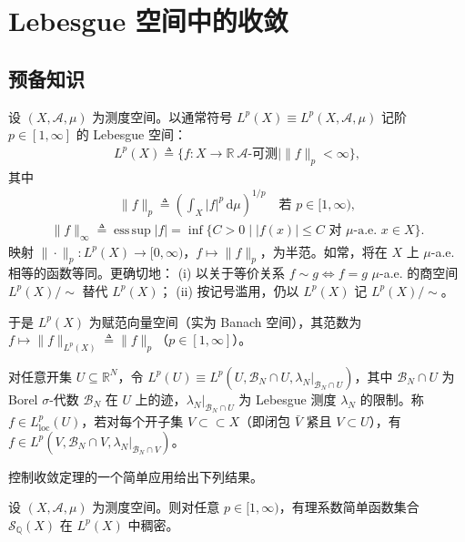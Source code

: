 \documentclass[../../main.tex]{subfiles}%
\begin{document}
\section{Lebesgue 空间中的收敛}\label{section:ch02-Lebesgue收敛}

\subsection{预备知识}\label{subsection:ch02-Lp预备}

设 $(X,\mathscr A,\mu)$ 为测度空间。以通常符号 $L^p(X)\equiv L^p(X,\mathscr A,\mu)$ 记阶 $p\in[1,\infty]$ 的 Lebesgue 空间：
\begin{align*}
L^p(X)\triangleq \{f:X\to\mathbb R\ \mathscr A\text{-可测}\mid\|f\|_p<\infty\},
\end{align*}
其中
\begin{align*}
\|f\|_p\triangleq \left(\int_X|f|^p\,\mathrm{d}\mu\right)^{1/p}\quad\text{若 }p\in[1,\infty),
\end{align*}
\begin{align*}
\|f\|_\infty\triangleq \operatorname*{ess\,sup}|f|
=\inf\{C>0\mid|f(x)|\leqslant C\text{ 对 }\mu\text{-a.e. }x\in X\}.
\end{align*}
映射 $\|\cdot\|_p:L^p(X)\to[0,\infty)$，$f\mapsto\|f\|_p$，为半范。如常，将在 $X$ 上 $\mu$-a.e. 相等的函数等同。更确切地：
(i) 以关于等价关系 $f\sim g\Leftrightarrow f=g$ $\mu$-a.e. 的商空间 $L^p(X)/\sim$ 替代 $L^p(X)$；
(ii) 按记号滥用，仍以 $L^p(X)$ 记 $L^p(X)/\sim$。

于是 $L^p(X)$ 为赋范向量空间（实为 Banach 空间），其范数为 $f\mapsto\|f\|_{L^p(X)}\triangleq \|f\|_p$（$p\in[1,\infty]$）。

\begin{remark}\label{remark:ch02-Lploc}
\label{remark:ch02-Lp局部}
对任意开集 $U\subseteq\mathbb R^N$，令 $L^p(U)\equiv L^p(U,\mathscr B_N\cap U,\lambda_N|_{\mathscr B_N\cap U})$，其中 $\mathscr B_N\cap U$ 为 Borel $\sigma$-代数 $\mathscr B_N$ 在 $U$ 上的迹，$\lambda_N|_{\mathscr B_N\cap U}$ 为 Lebesgue 测度 $\lambda_N$ 的限制。称 $f\in L^p_{\mathrm{loc}}(U)$，若对每个开子集 $V\subset\subset X$（即闭包 $\bar V$ 紧且 $V\subset U$），有 $f\in L^p(V,\mathscr B_N\cap V,\lambda_N|_{\mathscr B_N\cap V})$。
\end{remark}

控制收敛定理的一个简单应用给出下列结果。

\begin{lemma}\label{lemma:ch02-有理简单函数稠密}
\label{lemma:ch02-简单函数}
设 $(X,\mathscr A,\mu)$ 为测度空间。则对任意 $p\in[1,\infty)$，有理系数简单函数集合 $\mathscr S_{\mathbb Q}(X)$ 在 $L^p(X)$ 中稠密。
\end{lemma}
\end{document}
